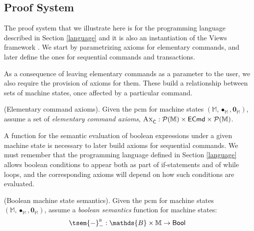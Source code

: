\subsection{Proof System}

The proof system that we illustrate here is for the programming language described in Section \ref{language} and it is also an instantiation of the Views framework \cite{views}. We start by parametrizing axioms for elementary commands, and later define the ones for sequential commands and transactions.

As a consequence of leaving elementary commands as a parameter to the user, we also require the provision of axioms for them. These build a relationship between sets of machine states, once affected by a particular command.
\begin{param}
	\label{param:ecmdAx}
	(Elementary command axioms).
	Given the pcm for machine states $(\mathbb{M}, \bullet_\mathbb{M}, \mathbf{0}_\mathbb{M})$, assume a set of \emph{elementary command axioms}, $\textsc{Ax}_{\hat{\mathsf{C}}} : \mathcal{P}(\mathbb{M}) \times \mathsf{ECmd} \times \mathcal{P}(\mathbb{M})$.
\end{param}

A function for the semantic evaluation of boolean expressions under a given machine state is necessary to later build axioms for sequential commands. We must remember that the programming language defined in Section \ref{language} allows boolean conditions to appear both as part of if-statements and of while loops, and the corresponding axioms will depend on how such conditions are evaluated.
\begin{param}
	\label{param:boolMachine}
	(Boolean machine state semantics).
	Given the pcm for machine states $(\mathbb{M}, \bullet_\mathbb{M}, \mathbf{0}_\mathbb{M})$, assume a \emph{boolean semantics} function for machine states:
	\[
		\tsem{-}^\textsc{b}_- : \mathds{B} \times \mathbb{M} \rightarrow \mathsf{Bool}
	\]
\end{param}

